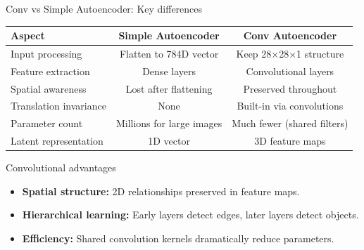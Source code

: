 \documentclass{beamer}
\begin{document}
\begin{frame}{Conv vs Simple Autoencoder: Key differences}
\begin{center}
{\tiny
  \begin{tabular}{|l|c|c|}
\hline
\textbf{Aspect} & \textbf{Simple Autoencoder} & \textbf{Conv Autoencoder} \\
\hline
\alert{Input processing} & Flatten to 784D vector & Keep 28×28×1 structure \\
\hline
\alert{Feature extraction} & Dense layers & Convolutional layers \\
\hline
\alert{Spatial awareness} & Lost after flattening & Preserved throughout \\
\hline
\alert{Translation invariance} & None & Built-in via convolutions \\
\hline
\alert{Parameter count} & Millions for large images & Much fewer (shared filters) \\
\hline
\alert{Latent representation} & 1D vector & 3D feature maps \\
\hline
  \end{tabular}
}
\end{center}

\vspace{0.5cm}\pause
\begin{alertblock}{\alert{Convolutional advantages}}
\begin{itemize}
\item \textbf{Spatial structure:} 2D relationships preserved in feature maps.
\vspace{0.3cm}
\item \textbf{Hierarchical learning:} Early layers detect edges, later layers detect objects.
\vspace{0.3cm}
\item \textbf{Efficiency:} Shared convolution kernels dramatically reduce parameters.
\end{itemize}
\end{alertblock}
\end{frame}
\end{document}
